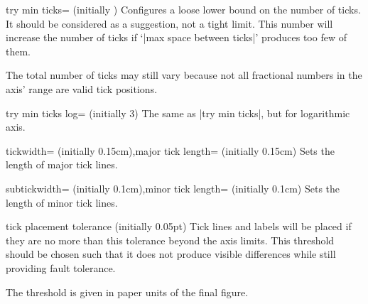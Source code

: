 \begin{pgfplotskey}{try min ticks= (initially \axisdefaulttryminticks)}
	Configures a loose lower bound on the number of ticks. It should be considered as a suggestion, not a tight limit. This number will increase the number of ticks if `|max space between ticks|' produces too few of them.

	The total number of ticks may still vary because not all fractional numbers in the axis' range are valid tick positions.
\end{pgfplotskey}

\begin{pgfplotskey}{try min ticks log= (initially 3)}
	The same as |try min ticks|, but for logarithmic axis.
\end{pgfplotskey}

\begin{pgfplotskeylist}{tickwidth= (initially 0.15cm),major tick length= (initially 0.15cm)}
	Sets the length of major tick lines.
\end{pgfplotskeylist}

\begin{pgfplotskeylist}{subtickwidth= (initially 0.1cm),minor tick length= (initially 0.1cm)}
	Sets the length of minor tick lines.
\end{pgfplotskeylist}

\begin{pgfplotsxykeylist}{\x tick placement tolerance (initially 0.05pt)}
	Tick lines and labels will be placed if they are no more than this tolerance beyond the axis limits. This threshold should be chosen such that it does not produce visible differences while still providing fault tolerance.

	The threshold is given in paper units of the final figure.
\end{pgfplotsxykeylist}


